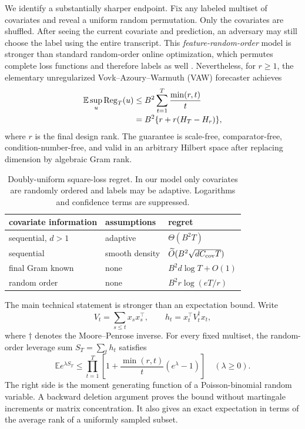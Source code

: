 \documentclass[twoside]{article}
\newcommand{\E}{\mathbb E}
\newcommand{\Reg}{\operatorname{Reg}}
\begin{document}
We identify a substantially sharper endpoint. Fix any labeled multiset of covariates and reveal a uniform random permutation. Only the covariates are shuffled. After seeing the current covariate and prediction, an adversary may still choose the label using the entire transcript. This \emph{feature-random-order} model is stronger than standard random-order online optimization, which permutes complete loss functions and therefore labels as well \citep{garber2020online,sherman2021optimal,bernasconi2025online}. Nevertheless, for $r\ge1$, the elementary unregularized Vovk--Azoury--Warmuth (VAW) forecaster achieves
\begin{align}
 \E\sup_u\Reg_T(u)
 &\le B^2\sum_{t=1}^T\frac{\min(r,t)}t\notag\\[-2pt]
 &=B^2\{r+r(H_T-H_r)\},
 \label{eq:intro-bound}
\end{align}
where $r$ is the final design rank. The guarantee is scale-free, comparator-free, condition-number-free, and valid in an arbitrary Hilbert space after replacing dimension by algebraic Gram rank.

\begin{table}[t]
\caption{Doubly-uniform square-loss regret. In our model only covariates are randomly ordered and labels may be adaptive. Logarithms and confidence terms are suppressed.}
\label{tab:phase}
\centering
\small \setlength{\tabcolsep}{3.5pt}
\begin{tabular}{@{}lll@{}}
\toprule
covariate information & assumptions & regret \\
\midrule
sequential, $d>1$ & adaptive & $\Theta(B^2T)$ \\
sequential & smooth density & $\widetilde O(B^2\sqrt{dC_{\rm cov}T})$ \\
final Gram known & none & $B^2d\log T+O(1)$ \\
random order & none & $B^2r\log(eT/r)$ \\
\bottomrule
\end{tabular}
\end{table}

The main technical statement is stronger than an expectation bound. Write \[ V_t=\sum_{s\le t}x_sx_s^\top, \qquad h_t=x_t^\top V_t^\dagger x_t, \] where $\dagger$ denotes the Moore--Penrose inverse. For every fixed multiset, the random-order leverage sum $S_T=\sum_t h_t$ satisfies
\begin{equation}
 \E e^{\lambda S_T}
 \le \prod_{t=1}^T\left[1+\frac{\min(r,t)}{t}(e^\lambda-1)\right]
 \quad(\lambda\ge0).
 \label{eq:intro-mgf}
\end{equation}
The right side is the moment generating function of a Poisson-binomial random variable. A backward deletion argument proves the bound without martingale increments or matrix concentration. It also gives an exact expectation in terms of the average rank of a uniformly sampled subset.
\end{document}
